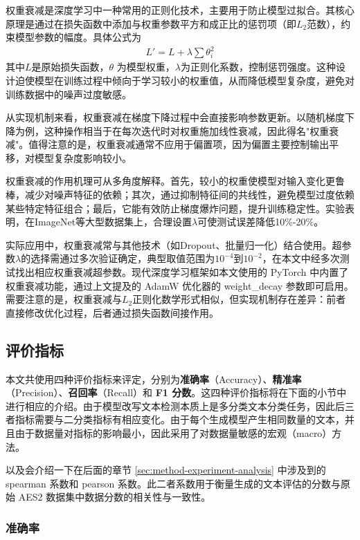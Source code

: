 权重衰减是深度学习中一种常用的正则化技术，主要用于防止模型过拟合。其核心原理是通过在损失函数中添加与权重参数平方和成正比的惩罚项（即$L_2$范数），约束模型参数的幅度。具体公式为
\begin{align}
L' = L + \lambda \sum \theta_i^2
\end{align}
其中$L$是原始损失函数，$\theta$ 为模型权重，$\lambda$为正则化系数，控制惩罚强度。这种设计迫使模型在训练过程中倾向于学习较小的权重值，从而降低模型复杂度，避免对训练数据中的噪声过度敏感。

从实现机制来看，权重衰减在梯度下降过程中会直接影响参数更新。以随机梯度下降为例，这种操作相当于在每次迭代时对权重施加线性衰减，因此得名"权重衰减"。值得注意的是，权重衰减通常不应用于偏置项，因为偏置主要控制输出平移，对模型复杂度影响较小。

权重衰减的作用机理可从多角度解释。首先，较小的权重使模型对输入变化更鲁棒，减少对噪声特征的依赖；其次，通过抑制特征间的共线性，避免模型过度依赖某些特定特征组合；最后，它能有效防止梯度爆炸问题，提升训练稳定性。实验表明，在ImageNet等大型数据集上，合理设置$\lambda$可使测试误差降低10\%-20\%。

实际应用中，权重衰减常与其他技术（如Dropout、批量归一化）结合使用。超参数$\lambda$的选择需通过多次验证确定，典型取值范围为$10^{-4}$到$10^{-2}$，在本文中经多次测试找出相应权重衰减超参数。现代深度学习框架如本文使用的 PyTorch 中内置了权重衰减功能，通过上文提及的 AdamW 优化器的 weight\_decay 参数即可启用。需要注意的是，权重衰减与$L_2$正则化数学形式相似，但实现机制存在差异：前者直接修改优化过程，后者通过损失函数间接作用。

\subsection{评价指标}
\label{sec:method-experiment-metric}

本文共使用四种评价指标来评定，分别为\textbf{准确率}（Accuracy）、\textbf{精准率}（Precision）、\textbf{召回率}（Recall）和 \textbf{F1 分数}。这四种评价指标将在下面的小节中进行相应的介绍。由于模型改写文本检测本质上是多分类文本分类任务，因此后三者指标需要与二分类指标有相应变化。由于每个生成模型产生相同数量的文本，并且由于数据量对指标的影响最小，因此采用了对数据量敏感的宏观（macro）方法。

以及会介绍一下在后面的章节 \ref{sec:method-experiment-analysis} 中涉及到的 spearman 系数和 pearson 系数。此二者系数用于衡量生成的文本评估的分数与原始 AES2 数据集中数据分数的相关性与一致性。

\subsubsection{准确率}


